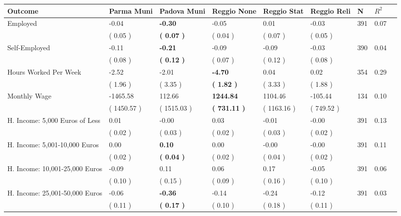 \begin{tabular}{L{6.2cm} C{1.8cm} C{1.8cm} C{1.8cm} C{1.8cm} C{1.8cm} C{1.8cm} C{0.3cm} C{0.3cm}}
\toprule
 \textbf{Outcome} & \textbf{Parma Muni} & \textbf{Padova Muni} & \textbf{Reggio None} & \textbf{Reggio Stat} & \textbf{Reggio Reli} & \textbf{N} & \textbf{$ R^2$} \\
\midrule
Employed &     -0.04 & \textbf{    -0.30} &     -0.05 &      0.01 &     -0.03  & 391 &       0.07 \\ 
 & (     0.05 ) & \textbf{(     0.07 )} & (     0.04 ) & (     0.07 ) & (     0.05 )  & \\
Self-Employed &     -0.11 & \textbf{    -0.21} &     -0.09 &     -0.09 &     -0.03  & 390 &       0.04 \\ 
 & (     0.08 ) & \textbf{(     0.12 )} & (     0.07 ) & (     0.12 ) & (     0.08 )  & \\
Hours Worked Per Week &     -2.52 &     -2.01 & \textbf{    -4.70} &      0.04 &      0.02  & 354 &       0.29 \\ 
 & (     1.96 ) & (     3.35 ) & \textbf{(     1.82 )} & (     3.33 ) & (     1.88 )  & \\
Monthly Wage &  -1465.58 &    112.66 & \textbf{  1244.84} &   1104.46 &   -105.44  & 134 &       0.10 \\ 
 & (  1450.57 ) & (  1515.03 ) & \textbf{(   731.11 )} & (  1163.16 ) & (   749.52 )  & \\
H. Income: 5,000 Euros of Less &      0.01 &     -0.00 &      0.03 &     -0.01 &     -0.00  & 391 &       0.13 \\ 
 & (     0.02 ) & (     0.03 ) & (     0.02 ) & (     0.03 ) & (     0.02 )  & \\
H. Income: 5,001-10,000 Euros &      0.00 & \textbf{     0.10} &      0.00 &     -0.00 &     -0.00  & 391 &       0.11 \\ 
 & (     0.02 ) & \textbf{(     0.04 )} & (     0.02 ) & (     0.04 ) & (     0.02 )  & \\
H. Income: 10,001-25,000 Euros &     -0.09 &      0.11 &      0.06 &      0.17 &     -0.05  & 391 &       0.06 \\ 
 & (     0.10 ) & (     0.15 ) & (     0.09 ) & (     0.16 ) & (     0.10 )  & \\
H. Income: 25,001-50,000 Euros &     -0.06 & \textbf{    -0.36} &     -0.14 &     -0.24 &     -0.12  & 391 &       0.03 \\ 
 & (     0.11 ) & \textbf{(     0.17 )} & (     0.10 ) & (     0.18 ) & (     0.11 )  & \\

\end{tabular}
